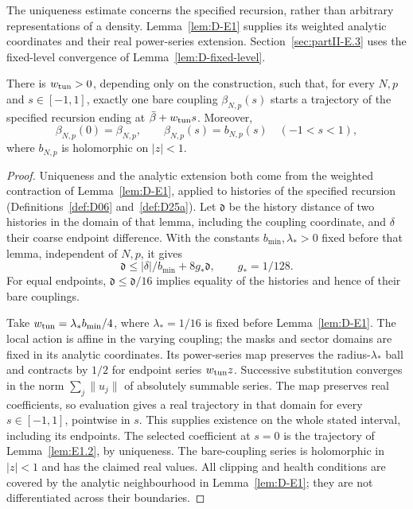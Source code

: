 The uniqueness estimate concerns the specified recursion, rather than arbitrary representations of a density. Lemma~\ref{lem:D-E1} supplies its weighted analytic coordinates and their real power-series extension. Section~\ref{sec:partII-E.3} uses the fixed-level convergence of Lemma~\ref{lem:D-fixed-level}.
\begin{lemma}\label{lem:E1.3}
There is $w_{\rm tun}>0$, depending only on the construction, such that, for every $N,p$ and $s\in[-1,1]$, exactly one bare coupling $\beta_{N,p}(s)$ starts a trajectory of the specified recursion ending at $\bar\beta+w_{\rm tun}s$. Moreover,
\begin{equation*}
\beta_{N,p}(0)=\beta_{N,p},\qquad
\beta_{N,p}(s)=b_{N,p}(s)\quad(-1<s<1),
\end{equation*}
where $b_{N,p}$ is holomorphic on $|z|<1$.
\end{lemma}
\begin{proof}
Uniqueness and the analytic extension both come from the weighted contraction of Lemma~\ref{lem:D-E1}, applied to histories of the specified recursion (Definitions~\ref{def:D06} and~\ref{def:D25a}). Let $\mathfrak d$ be the history distance of two histories in the domain of that lemma, including the coupling coordinate, and $\delta$ their coarse endpoint difference. With the constants $b_{\min},\lambda_*>0$ fixed before that lemma, independent of $N,p$, it gives
\begin{equation}\label{eq:E-analytic-input}
\mathfrak d\le |\delta|/b_{\min}+8g_*\mathfrak d,\qquad g_*=1/128.
\end{equation}
For equal endpoints, $\mathfrak d\le \mathfrak d/16$ implies equality of the histories and hence of their bare couplings.

Take $w_{\rm tun}=\lambda_*b_{\min}/4$, where $\lambda_*=1/16$ is fixed before Lemma~\ref{lem:D-E1}. The local action is affine in the varying coupling; the masks and sector domains are fixed in its analytic coordinates. Its power-series map preserves the radius-$\lambda_*$ ball and contracts by $1/2$ for endpoint series $w_{\rm tun}z$. Successive substitution converges in the norm $\sum_j\|u_j\|$ of absolutely summable series. The map preserves real coefficients, so evaluation gives a real trajectory in that domain for every $s\in[-1,1]$, pointwise in $s$. This supplies existence on the whole stated interval, including its endpoints. The selected coefficient at $s=0$ is the trajectory of Lemma~\ref{lem:E1.2}, by uniqueness. The bare-coupling series is holomorphic in $|z|<1$ and has the claimed real values. All clipping and health conditions are covered by the analytic neighbourhood in Lemma~\ref{lem:D-E1}; they are not differentiated across their boundaries.
\end{proof}


